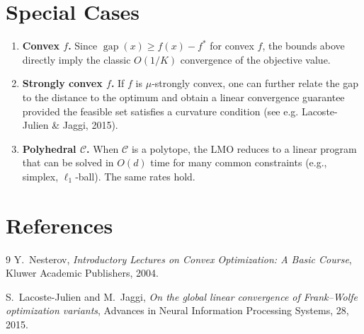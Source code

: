 \documentclass{article}
\newcommand{\gap}{\operatorname{gap}}
\begin{document}
\section{Special Cases}
\label{sec:special}
\begin{enumerate}[label=\alph*)]
\item \textbf{Convex $f$.}  Since $\gap(x)\ge f(x)-f^{*}$ for convex $f$, the bounds above directly imply the classic $O(1/K)$ convergence of the objective value.
\item \textbf{Strongly convex $f$.}  If $f$ is $\mu$‑strongly convex, one can further relate the gap to the distance to the optimum and obtain a linear convergence guarantee provided the feasible set satisfies a curvature condition (see e.g. Lacoste-Julien \& Jaggi, 2015).
\item \textbf{Polyhedral $\mathcal C$.}  When $\mathcal C$ is a polytope, the LMO reduces to a linear program that can be solved in $O(d)$ time for many common constraints (e.g., simplex, $\ell_{1}$‑ball).  The same rates hold.
\end{enumerate}

\section*{References}
\begin{thebibliography}{9}
Y.~Nesterov,
\newblock \emph{Introductory Lectures on Convex Optimization: A Basic Course},
\newblock Kluwer Academic Publishers, 2004.

S.~Lacoste-Julien and M.~Jaggi,
\newblock \emph{On the global linear convergence of Frank–Wolfe optimization variants},
\newblock Advances in Neural Information Processing Systems, 28, 2015.
\end{thebibliography}
\end{document}
